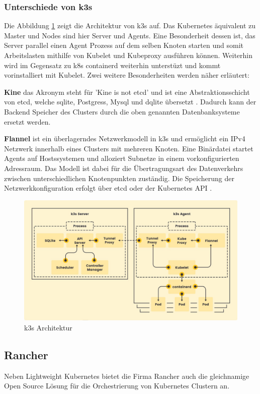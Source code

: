 \subsubsection{Unterschiede von k3s}
Die Abbildung \ref{fig:k3sarchitektur} zeigt die Architektur von k3s auf. Das Kubernetes äquivalent zu Master und Nodes
sind hier Server und Agents. Eine Besonderheit dessen ist, das Server parallel einen Agent Prozess auf dem selben Knoten starten und
somit Arbeitslasten mithilfe von Kubelet und Kubeproxy ausführen können. Weiterhin wird im Gegensatz zu k8s containerd weiterhin unterstüzt und
kommt vorinstalliert mit Kubelet. Zwei weitere Besonderheiten werden näher erläutert:

\textbf{Kine}
das Akronym steht für 'Kine is not etcd' und ist eine Abstraktionsschicht von etcd, welche sqlite, Postgress, Mysql und dqlite übersetzt \cite{k3sgit}.
Dadurch kann der Backend Speicher des Clusters durch die oben genannten Datenbanksysteme ersetzt werden.

\textbf{Flannel}
ist ein überlagerndes Netzwerkmodell in k3s und ermöglicht ein IPv4 Netzwerk innerhalb eines Clusters mit mehreren Knoten.
Eine Binärdatei startet Agents auf Hostssystemen und alloziert Subnetze in einem vorkonfigurierten Adressraum.
Das Modell ist dabei für die Übertragungsart des Datenverkehrs zwischen unterschiedlichen Knotenpunkten zuständig.
Die Speicherung der Netzwerkkonfiguration erfolgt über etcd oder der Kubernetes API \cite{flannel}.


\begin{figure}
  \centering
  \includegraphics[width=1.0\columnwidth]{images/k3s-architecture.jpeg}
  \caption{k3s Architektur \cite{k3sarch}}
  \label{fig:k3sarchitektur}
\end{figure}

\subsection{Rancher}
Neben Lightweight Kubernetes bietet die Firma Rancher auch die gleichnamige Open Source Lösung für 
die Orchestrierung von Kubernetes Clustern an. 

